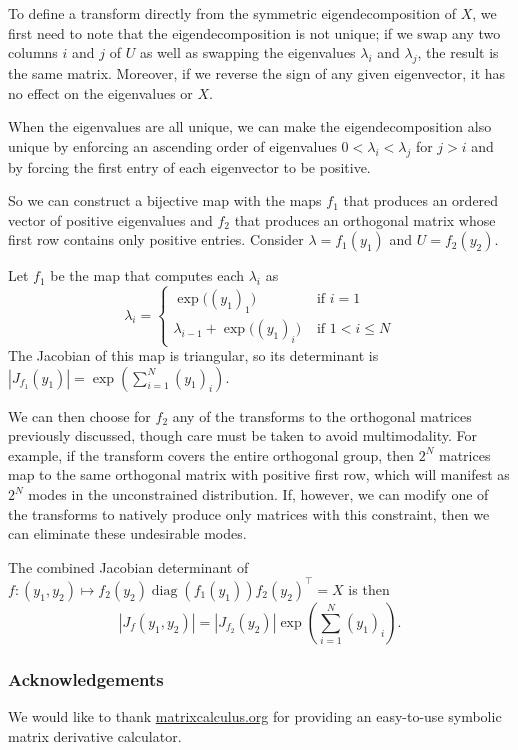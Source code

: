 \documentclass[11pt]{article}
\newcommand{\abs}[1]{\left| #1 \right|}
\newcommand{\absdet}[1]{\abs{#1}}
\begin{document}
To define a transform directly from the symmetric eigendecomposition of $X$, we first need to note that the eigendecomposition is not unique; if we swap any two columns $i$ and $j$ of $U$ as well as swapping the eigenvalues $\lambda_i$ and $\lambda_j$, the result is the same matrix.
Moreover, if we reverse the sign of any given eigenvector, it has no effect on the eigenvalues or $X$.

When the eigenvalues are all unique, we can make the eigendecomposition also unique by enforcing an ascending order of eigenvalues $0 < \lambda_i < \lambda_j$ for $j > i$ and by forcing the first entry of each eigenvector to be positive.

So we can construct a bijective map with the maps $f_1$ that produces an ordered vector of positive eigenvalues and $f_2$ that produces an orthogonal matrix whose first row contains only positive entries.
Consider $\lambda = f_1(y_1)$ and $U = f_2(y_2)$.

Let $f_1$ be the map that computes each $\lambda_i$ as
\[
  \lambda_i = \begin{cases}
   \exp\bigl((y_1)_1\bigr) &\text{ if } i = 1\\
    \lambda_{i-1} + \exp\bigl((y_1)_i\bigr) &\text{ if } 1 < i \le N
  \end{cases}
\]
The Jacobian of this map is triangular, so its determinant is $\absdet{J_{f_1}(y_1)} = \exp\left(\sum_{i=1}^N (y_1)_i\right)$.

We can then choose for $f_2$ any of the transforms to the orthogonal matrices previously discussed, though care must be taken to avoid multimodality.
For example, if the transform covers the entire orthogonal group, then $2^N$ matrices map to the same orthogonal matrix with positive first row, which will manifest as $2^N$ modes in the unconstrained distribution.
If, however, we can modify one of the transforms to natively produce only matrices with this constraint, then we can eliminate these undesirable modes.

The combined Jacobian determinant of $f: (y_1, y_2) \mapsto f_2(y_2) \operatorname{diag}(f_1(y_1)) f_2(y_2)^\top = X$ is then 
\[ \absdet{J_{f}(y_1, y_2)} = \absdet{J_{f_2}(y_2)} \exp\left(\sum_{i=1}^N (y_1)_i\right).\]



\subsubsection*{Acknowledgements}

We would like to thank \url{matrixcalculus.org} for providing an
easy-to-use symbolic matrix derivative calculator.



{}

\end{document}
